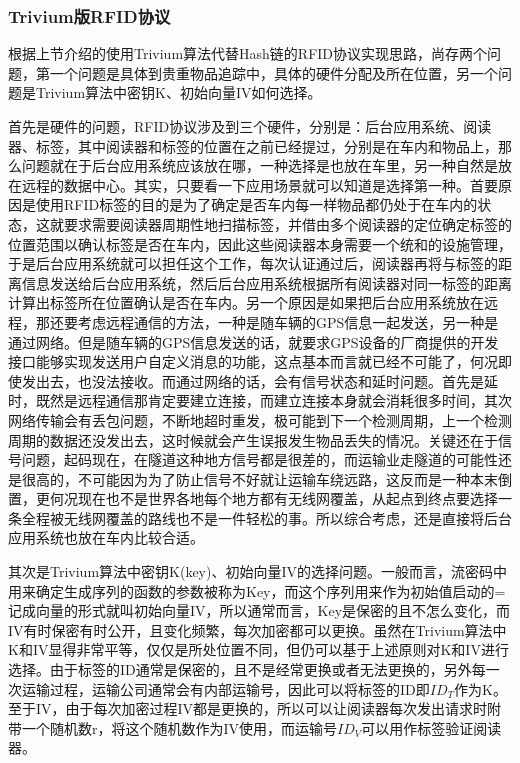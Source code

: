 \subsubsection{Trivium版RFID协议}

根据上节介绍的使用Trivium算法代替Hash链的RFID协议实现思路，尚存两个问题，第一个问题是具体到贵重物品追踪中，具体的硬件分配及所在位置，另一个问题是Trivium算法中密钥K、初始向量IV如何选择。

首先是硬件的问题，RFID协议涉及到三个硬件，分别是：后台应用系统、阅读器、标签，其中阅读器和标签的位置在之前已经提过，分别是在车内和物品上，那么问题就在于后台应用系统应该放在哪，一种选择是也放在车里，另一种自然是放在远程的数据中心。其实，只要看一下应用场景就可以知道是选择第一种。首要原因是使用RFID标签的目的是为了确定是否车内每一样物品都仍处于在车内的状态，这就要求需要阅读器周期性地扫描标签，并借由多个阅读器的定位确定标签的位置范围以确认标签是否在车内，因此这些阅读器本身需要一个统和的设施管理，于是后台应用系统就可以担任这个工作，每次认证通过后，阅读器再将与标签的距离信息发送给后台应用系统，然后后台应用系统根据所有阅读器对同一标签的距离计算出标签所在位置确认是否在车内。另一个原因是如果把后台应用系统放在远程，那还要考虑远程通信的方法，一种是随车辆的GPS信息一起发送，另一种是通过网络。但是随车辆的GPS信息发送的话，就要求GPS设备的厂商提供的开发接口能够实现发送用户自定义消息的功能，这点基本而言就已经不可能了，何况即使发出去，也没法接收。而通过网络的话，会有信号状态和延时问题。首先是延时，既然是远程通信那肯定要建立连接，而建立连接本身就会消耗很多时间，其次网络传输会有丢包问题，不断地超时重发，极可能到下一个检测周期，上一个检测周期的数据还没发出去，这时候就会产生误报发生物品丢失的情况。关键还在于信号问题，起码现在，在隧道这种地方信号都是很差的，而运输业走隧道的可能性还是很高的，不可能因为为了防止信号不好就让运输车绕远路，这反而是一种本末倒置，更何况现在也不是世界各地每个地方都有无线网覆盖，从起点到终点要选择一条全程被无线网覆盖的路线也不是一件轻松的事。所以综合考虑，还是直接将后台应用系统也放在车内比较合适。

其次是Trivium算法中密钥K(key)、初始向量IV的选择问题。一般而言，流密码中用来确定生成序列的函数的参数被称为Key，而这个序列用来作为初始值启动的=记成向量的形式就叫初始向量IV，所以通常而言，Key是保密的且不怎么变化，而IV有时保密有时公开，且变化频繁，每次加密都可以更换。虽然在Trivium算法中K和IV显得非常平等，仅仅是所处位置不同，但仍可以基于上述原则对K和IV进行选择。由于标签的ID通常是保密的，且不是经常更换或者无法更换的，另外每一次运输过程，运输公司通常会有内部运输号，因此可以将标签的ID即$ID_{T}$作为K。至于IV，由于每次加密过程IV都是更换的，所以可以让阅读器每次发出请求时附带一个随机数r，将这个随机数作为IV使用，而运输号$ID_{V}$可以用作标签验证阅读器。

